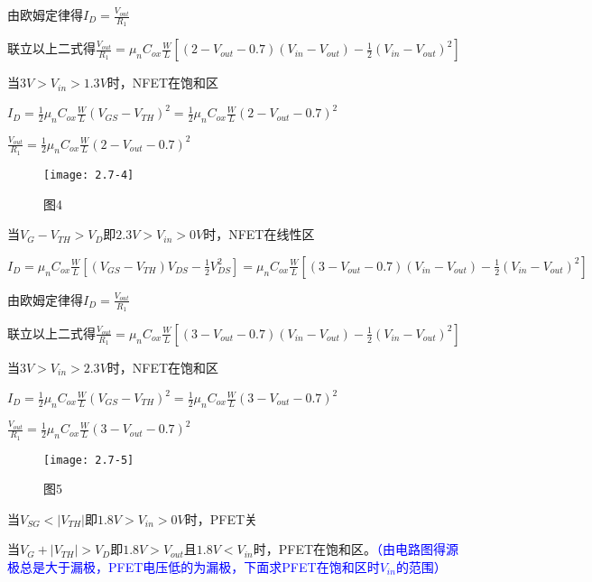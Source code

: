 由欧姆定律得$I_D=\frac{V_{out}}{R_1}$

联立以上二式得$\frac{V_{out}}{R_1}=\mu_nC_{ox}\frac{W}{L}[(2-V_{out}-0.7)(V_{in}-V_{out})-\frac{1}{2}(V_{in}-V_{out})^2]$

当$3V>V_{in}>1.3V$时，NFET在饱和区

$I_D=\frac{1}{2}\mu_nC_{ox}\frac{W}{L}(V_{GS}-V_{TH})^2=\frac{1}{2}\mu_nC_{ox}\frac{W}{L}(2-V_{out}-0.7)^2$

$\frac{V_{out}}{R_1}=\frac{1}{2}\mu_nC_{ox}\frac{W}{L}(2-V_{out}-0.7)^2$

		\begin{figure}[H] %
	\begin{minipage}{\linewidth}
		\texttt{[image: 2.7-4]}
	\end{minipage}
	\caption*{图4} %
\end{figure}

\scalebox{3}{（c）}

当$V_{G}-V_{TH}>V_{D}$即$2.3V>V_{in}>0V$时，NFET在线性区

$I_D=\mu_nC_{ox}\frac{W}{L}[(V_{GS}-V_{TH})V_{DS}-\frac{1}{2}V_{DS}^2]=\mu_nC_{ox}\frac{W}{L}[(3-V_{out}-0.7)(V_{in}-V_{out})-\frac{1}{2}(V_{in}-V_{out})^2]$

由欧姆定律得$I_D=\frac{V_{out}}{R_1}$

联立以上二式得$\frac{V_{out}}{R_1}=\mu_nC_{ox}\frac{W}{L}[(3-V_{out}-0.7)(V_{in}-V_{out})-\frac{1}{2}(V_{in}-V_{out})^2]$

当$3V>V_{in}>2.3V$时，NFET在饱和区

$I_D=\frac{1}{2}\mu_nC_{ox}\frac{W}{L}(V_{GS}-V_{TH})^2=\frac{1}{2}\mu_nC_{ox}\frac{W}{L}(3-V_{out}-0.7)^2$

$\frac{V_{out}}{R_1}=\frac{1}{2}\mu_nC_{ox}\frac{W}{L}(3-V_{out}-0.7)^2$

\begin{figure}[H] %
	\begin{minipage}{\linewidth}
		\texttt{[image: 2.7-5]}
	\end{minipage}
	\caption*{图5} %
\end{figure}

\scalebox{3}{（d）}

当$V_{SG}<|V_{TH}|$即$1.8V>V_{in}>0V$时，PFET关

当$V_{G}+|V_{TH}|>V_{D}$即$1.8V>V_{out}$且$1.8V<V_{in}$时，PFET在饱和区。\textcolor{blue}{（由电路图得源极总是大于漏极，PFET电压低的为漏极，下面求PFET在饱和区时$V_{in}$的范围）}

